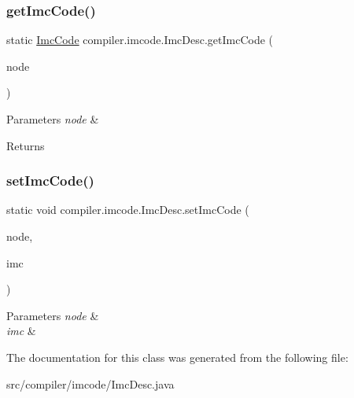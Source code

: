 \subsubsection{\texorpdfstring{get\+Imc\+Code()}{getImcCode()}}
{\footnotesize\ttfamily static \hyperlink{interfacecompiler_1_1imcode_1_1_imc_code}{Imc\+Code} compiler.\+imcode.\+Imc\+Desc.\+get\+Imc\+Code (\begin{DoxyParamCaption}\item[{\hyperlink{classcompiler_1_1abstr_1_1tree_1_1_abs_tree}{Abs\+Tree}}]{node }\end{DoxyParamCaption})\hspace{0.3cm}{\ttfamily [static]}}


\begin{DoxyParams}{Parameters}
{\em node} & \\
\hline
\end{DoxyParams}
\begin{DoxyReturn}{Returns}

\end{DoxyReturn}
\mbox{\label{classcompiler_1_1imcode_1_1_imc_desc_a473fce2cdedd413a152653740dc4efc9}} 
\subsubsection{\texorpdfstring{set\+Imc\+Code()}{setImcCode()}}
{\footnotesize\ttfamily static void compiler.\+imcode.\+Imc\+Desc.\+set\+Imc\+Code (\begin{DoxyParamCaption}\item[{\hyperlink{classcompiler_1_1abstr_1_1tree_1_1_abs_tree}{Abs\+Tree}}]{node,  }\item[{\hyperlink{interfacecompiler_1_1imcode_1_1_imc_code}{Imc\+Code}}]{imc }\end{DoxyParamCaption})\hspace{0.3cm}{\ttfamily [static]}}


\begin{DoxyParams}{Parameters}
{\em node} & \\
\hline
{\em imc} & \\
\hline
\end{DoxyParams}


The documentation for this class was generated from the following file\+:\begin{DoxyCompactItemize}
\item 
src/compiler/imcode/Imc\+Desc.\+java\end{DoxyCompactItemize}
